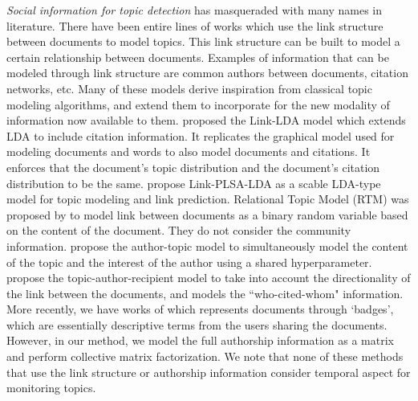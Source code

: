 \emph{Social information for topic detection} has masqueraded with many names in literature.
There have been entire lines of works which use the link structure between documents to model
topics.  This link structure can be built to model a certain relationship between documents.  Examples of
information that can be modeled through link structure are common authors between documents, citation networks, etc.
Many of these models derive inspiration from classical topic modeling algorithms, and extend them
to incorporate for the new modality of information now available to them.
\cite{Erosheva:2004} proposed the Link-LDA model which extends LDA to include citation information.
It replicates the graphical model used for modeling documents and words to also model documents and
citations.  It enforces that the document's topic distribution and the document's citation distribution
to be the same.  \cite{Nallapati:2008} propose Link-PLSA-LDA as a scable LDA-type model
for topic modeling and link prediction.  Relational Topic Model (RTM) was proposed by \cite{chang2009relational}
to model link between documents as a binary random variable based on the content of the document.  They
do not consider the community information.  \cite{Rosen-Zvi:2004} propose the author-topic model to
simultaneously model the content of the topic and the interest of the author using a shared hyperparameter.  
\cite{McCallum:2007} propose the topic-author-recipient model to take into account the directionality
of the link between the documents, and models the ``who-cited-whom" information.
More recently, we have works of \cite{El-Arini:2013} which represents documents through `badges',
which are essentially descriptive terms from the users sharing the documents.  However, in our
method, we model the full authorship information as a matrix and perform collective matrix factorization.
We note that none of these methods that use the link structure or authorship information consider temporal
aspect for monitoring topics.
